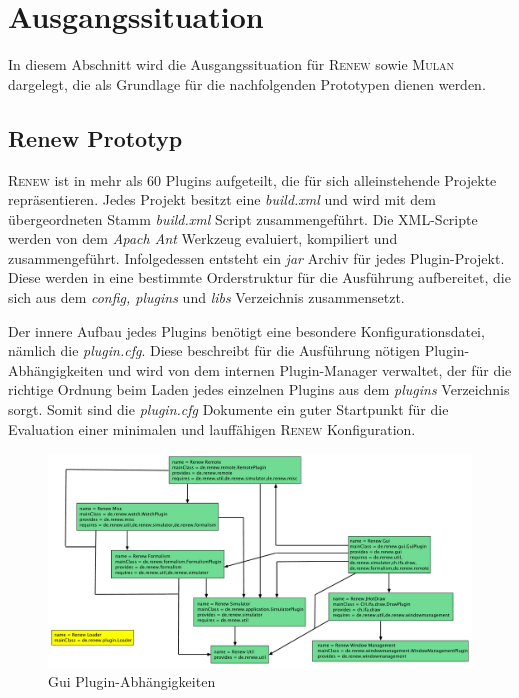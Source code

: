 	\newpage
	
\section{Ausgangssituation} \label{sec:ausgangssituation} 
	In diesem Abschnitt wird die Ausgangssituation für \textsc{Renew} sowie \textsc{Mulan} dargelegt, die als Grundlage für die nachfolgenden Prototypen dienen werden. 

	\subsection{Renew Prototyp} \label{sub:renew}
		\textsc{Renew} ist in mehr als 60 Plugins aufgeteilt, die für sich alleinstehende Projekte repräsentieren. Jedes Projekt besitzt eine \textit{build.xml} und wird mit dem übergeordneten Stamm \textit{build.xml} Script zusammengeführt. Die XML-Scripte werden von dem \textit{Apach Ant} Werkzeug evaluiert, kompiliert und zusammengeführt. Infolgedessen entsteht ein \textit{jar} Archiv für jedes Plugin-Projekt. Diese werden in eine bestimmte Orderstruktur für die Ausführung aufbereitet, die sich aus dem \textit{config, plugins} und \textit{libs} Verzeichnis zusammensetzt. \bigbreak

		Der innere Aufbau jedes Plugins benötigt eine besondere Konfigurationsdatei, nämlich die \textit{plugin.cfg}. Diese beschreibt für die Ausführung nötigen Plugin-Abhängigkeiten und wird von dem internen Plugin-Manager verwaltet, der für die richtige Ordnung beim Laden jedes einzelnen Plugins aus dem \textit{plugins} Verzeichnis sorgt. Somit sind die \textit{plugin.cfg} Dokumente ein guter Startpunkt für die Evaluation einer minimalen und lauffähigen \textsc{Renew} Konfiguration. \bigbreak

		\begin{figure}[h!]
		  \centering
		  \includegraphics[scale=0.457, angle=90]{material/images/renew_plugin_dependencies2.pdf}
		  \caption{Gui Plugin-Abhängigkeiten}
		  \label{fig:plugin_deps}
		\end{figure}

